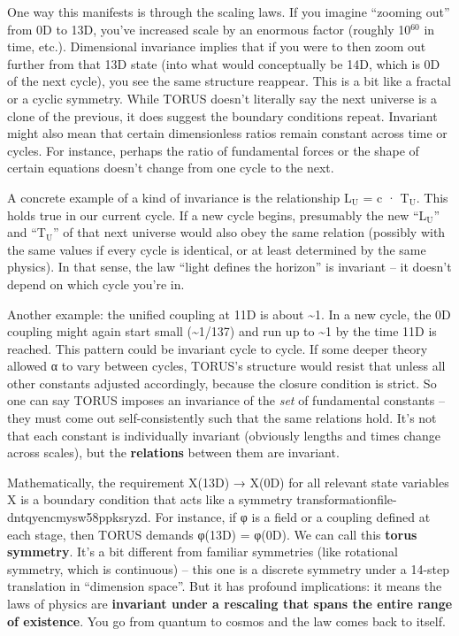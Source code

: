 \documentclass[]{article}
\newcommand{\subscript}[1]{\ensuremath{_{\mathrm{#1}}}}
\newcommand{\superscript}[1]{\ensuremath{^{\mathrm{#1}}}}
\begin{document}
One way this manifests is through the scaling laws. If you imagine
``zooming out'' from 0D to 13D, you've increased scale by an enormous
factor (roughly 10\superscript{60} in time, etc.). Dimensional invariance implies
that if you were to then zoom out further from that 13D state (into what
would conceptually be 14D, which is 0D of the next cycle), you see the
same structure reappear. This is a bit like a fractal or a cyclic
symmetry. While TORUS doesn't literally say the next universe is a clone
of the previous, it does suggest the boundary conditions repeat.
Invariant might also mean that certain dimensionless ratios remain
constant across time or cycles. For instance, perhaps the ratio of
fundamental forces or the shape of certain equations doesn't change from
one cycle to the next.

A concrete example of a kind of invariance is the relationship
L\subscript{U} = c ·
T\subscript{U}. This holds
true in our current cycle. If a new cycle begins, presumably the new
``L\subscript{U}'' and
``T\subscript{U}'' of that
next universe would also obey the same relation (possibly with the same
values if every cycle is identical, or at least determined by the same
physics). In that sense, the law ``light defines the horizon'' is
invariant -- it doesn't depend on which cycle you're in.

Another example: the unified coupling at 11D is about
\textasciitilde{}1. In a new cycle, the 0D coupling might again start
small (\textasciitilde{}1/137) and run up to \textasciitilde{}1 by the
time 11D is reached. This pattern could be invariant cycle to cycle. If
some deeper theory allowed α to vary between cycles, TORUS's structure
would resist that unless all other constants adjusted accordingly,
because the closure condition is strict. So one can say TORUS imposes an
invariance of the \emph{set} of fundamental constants -- they must come
out self-consistently such that the same relations hold. It's not that
each constant is individually invariant (obviously lengths and times
change across scales), but the \textbf{relations} between them are
invariant.

Mathematically, the requirement X(13D) → X(0D) for all relevant state
variables X is a boundary condition that acts like a symmetry
transformation​file-dntqyencmysw58ppksryzd. For instance, if φ is a
field or a coupling defined at each stage, then TORUS demands φ(13D) =
φ(0D). We can call this \textbf{torus symmetry}. It's a bit different
from familiar symmetries (like rotational symmetry, which is continuous)
-- this one is a discrete symmetry under a 14-step translation in
``dimension space''. But it has profound implications: it means the laws
of physics are \textbf{invariant under a rescaling that spans the entire
range of existence}. You go from quantum to cosmos and the law comes
back to itself.
\end{document}
